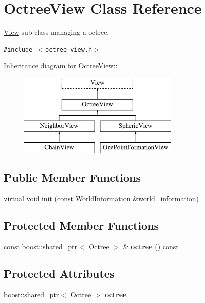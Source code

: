 \hypertarget{class_octree_view}{
\section{OctreeView Class Reference}
\label{class_octree_view}
}
\hyperlink{class_view}{View} sub class managing a octree.  


{\tt \#include $<$octree\_\-view.h$>$}

Inheritance diagram for OctreeView::\begin{figure}[H]
\begin{center}
\leavevmode
\includegraphics[height=4cm]{class_octree_view}
\end{center}
\end{figure}
\subsection*{Public Member Functions}
\begin{CompactItemize}
\item 
virtual void \hyperlink{class_octree_view_800b8d09dbd898769439f1765e7d87b1}{init} (const \hyperlink{class_world_information}{WorldInformation} \&world\_\-information)
\end{CompactItemize}
\subsection*{Protected Member Functions}
\begin{CompactItemize}
\item 
\hypertarget{class_octree_view_085a2326d14c933d278bce50391bde8a}{
const boost::shared\_\-ptr$<$ \hyperlink{class_octree}{Octree} $>$ \& \textbf{octree} () const }
\label{class_octree_view_085a2326d14c933d278bce50391bde8a}

\end{CompactItemize}
\subsection*{Protected Attributes}
\begin{CompactItemize}
\item 
\hypertarget{class_octree_view_2da509013a80d95319e5fc01d57d26c3}{
boost::shared\_\-ptr$<$ \hyperlink{class_octree}{Octree} $>$ \textbf{octree\_\-}}
\label{class_octree_view_2da509013a80d95319e5fc01d57d26c3}

\end{CompactItemize}


